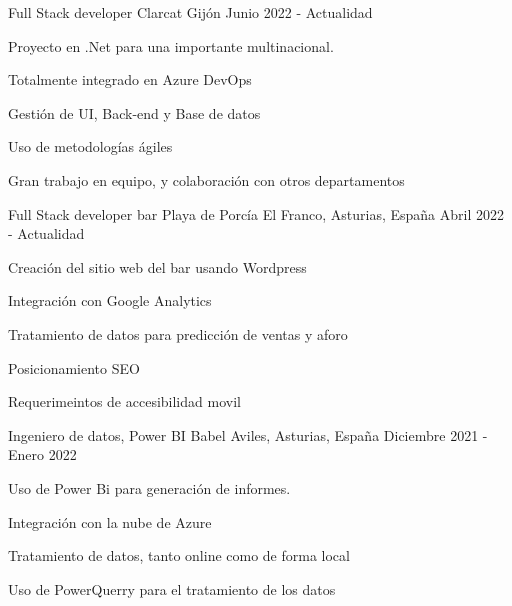 

\begin{cventries}
    
    \cventry
    {Full Stack developer} %
    {Clarcat} %
    {Gijón} %
    {Junio 2022 - Actualidad} %
    {
        \begin{cvitems} %
            \item {Proyecto en .Net para una importante multinacional.}
            \item {Totalmente integrado en Azure DevOps}
            \item {Gestión de UI, Back-end y Base de datos}
            \item {Uso de metodologías ágiles}
            \item {Gran trabajo en equipo, y colaboración con otros departamentos}
        \end{cvitems}
    }
    \cventry
    {Full Stack developer} %
    {bar Playa de Porcía} %
    {El Franco, Asturias, España} %
    {Abril 2022 - Actualidad} %
    {
        \begin{cvitems} %
            \item {Creación del sitio web del bar usando Wordpress}
            \item  {Integración con Google Analytics}
            \item {Tratamiento de datos para predicción de ventas y aforo}
            \item {Posicionamiento SEO}
            \item {Requerimeintos de accesibilidad movil}
        \end{cvitems}
    }

    \cventry
    {Ingeniero de datos, Power BI} %
    {Babel} %
    {Aviles, Asturias, España} %
    {Diciembre 2021 - Enero 2022} %
    {
        \begin{cvitems} %
            \item {Uso de Power Bi para generación de informes.}
            \item  {Integración con la nube de Azure}
            \item {Tratamiento de datos, tanto online como de forma local}
            \item {Uso de PowerQuerry para el tratamiento de los datos}
        \end{cvitems}
    }


\end{cventries}
